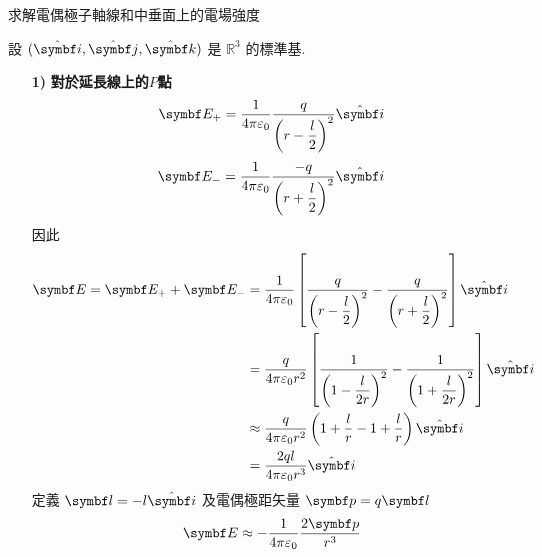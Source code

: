 \begin{problem}
求解電偶極子軸線和中垂面上的電場強度

\end{problem}

\begin{solve}
    設 $(\vu{i},\vu{j},\vu{k})$ 是 $\mathbb{R}^3$ 的標準基.
    \begin{itemize}
        \item[\textbf{1)}]\textbf{對於延長線上的$P$點}
              $$\va{E}_+ = \frac{1}{4\pi\varepsilon_0}\frac{q}{\left(r - \dfrac{l}{2}\right)^2} \vu{i}$$
              $$\va{E}_- = \frac{1}{4\pi\varepsilon_0}\frac{-q}{\left(r + \dfrac{l}{2}\right)^2} \vu{i}$$
              因此
              \begin{align*}
                  \va{E} = \va{E}_+ + \va{E}_-
                   & = \frac{1}{4\pi\varepsilon_0}\left[\frac{q}{\left(r-\dfrac{l}{2}\right)^2}-\frac{q}{\left(r+\dfrac{l}{2}\right)^2}\right]\vu{i}      \\
                   & = \frac{q}{4\pi\varepsilon_0r^2}\left[\frac{1}{\left(1-\dfrac{l}{2r}\right)^2}-\frac{1}{\left(1+\dfrac{l}{2r}\right)^2}\right]\vu{i} \\
                   & \approx \frac{q}{4\pi\varepsilon_0r^2} \left(1+\frac{l}{r} - 1 + \frac{l}{r}\right) \vu{i}                                           \\
                   & = \frac{2ql}{4\pi\varepsilon_0r^3}\vu{i}
              \end{align*}
              定義 $\va{l} = -l\vu{i}$ 及電偶極距矢量 $\va{p} = q\va{l}$
              $$
                  \va{E} \approx -\frac{1}{4\pi\varepsilon_0}\frac{2\va{p}}{r^3}
              $$


\end{itemize}
\end{solve}
